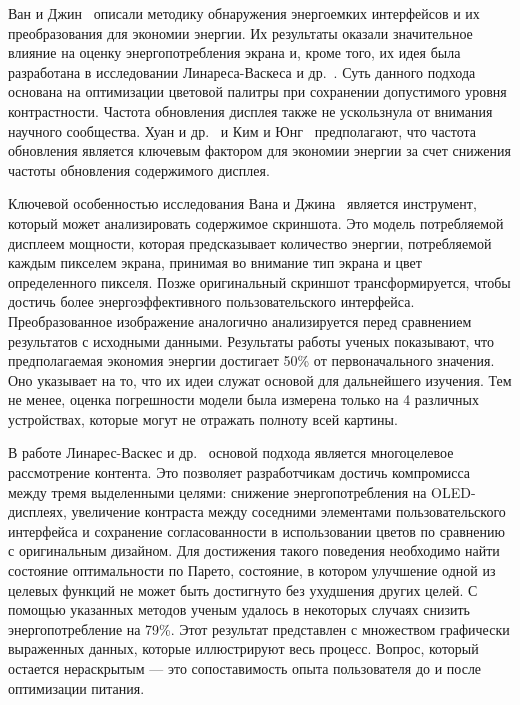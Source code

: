 \documentclass[a4paper,14pt]{extarticle} %
\begin{document}
	Ван и Джин~\parencite{wan2015detecting} описали методику обнаружения энергоемких интерфейсов и их преобразования для экономии энергии. Их результаты оказали значительное влияние на оценку энергопотребления экрана и, кроме того, их идея была разработана в исследовании Линареса-Васкеса и др.~\parencite{linares2018multi}. Суть данного подхода основана на оптимизации цветовой палитры при сохранении допустимого уровня контрастности. Частота обновления дисплея также не ускользнула от внимания научного сообщества. Хуан и др.~\parencite{huang2014intelligent} и Ким и Юнг~\parencite{kim2014content} предполагают, что частота обновления является ключевым фактором для экономии энергии за счет снижения частоты обновления содержимого дисплея.
	
	Ключевой особенностью исследования Вана и Джина~\parencite{wan2015detecting} является инструмент, который может анализировать содержимое скриншота. Это модель потребляемой дисплеем мощности, которая предсказывает количество энергии, потребляемой каждым пикселем экрана, принимая во внимание тип экрана и цвет определенного пикселя. Позже оригинальный скриншот трансформируется, чтобы достичь более энергоэффективного пользовательского интерфейса. Преобразованное изображение аналогично анализируется перед сравнением результатов с исходными данными. Результаты работы ученых показывают, что предполагаемая экономия энергии достигает 50\% от первоначального значения. Оно указывает на то, что их идеи служат основой для дальнейшего изучения. Тем не менее, оценка погрешности модели была измерена только на 4 различных устройствах, которые могут не отражать полноту всей картины.
	
	В работе Линарес-Васкес и др.~\parencite{linares2018multi} основой подхода является многоцелевое рассмотрение контента. Это позволяет разработчикам достичь компромисса между тремя выделенными целями: снижение энергопотребления на OLED-дисплеях, увеличение контраста между соседними элементами пользовательского интерфейса и сохранение согласованности в использовании цветов по сравнению с оригинальным дизайном. Для достижения такого поведения необходимо найти состояние оптимальности по Парето, состояние, в котором улучшение одной из целевых функций не может быть достигнуто без ухудшения других целей. С помощью указанных методов ученым удалось в некоторых случаях снизить энергопотребление на 79\%. Этот результат представлен с множеством графически выраженных данных, которые иллюстрируют весь процесс. Вопрос, который остается нераскрытым --- это сопоставимость опыта пользователя до и после оптимизации питания.
	
\end{document}
